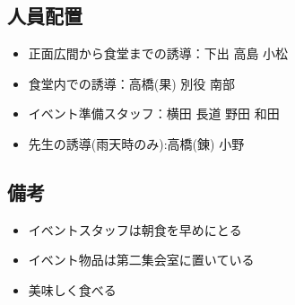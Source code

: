 \subsection{人員配置}
\begin{itemize}
\item 正面広間から食堂までの誘導：下出 高島 小松
\item 食堂内での誘導：高橋(果) 別役 南部
\item イベント準備スタッフ：横田 長道 野田 和田
  \item 先生の誘導(雨天時のみ):高橋(錬) 小野
\end{itemize}



\subsection{備考}
\begin{itemize}
\item イベントスタッフは朝食を早めにとる
\item イベント物品は第二集会室に置いている
\item 美味しく食べる


\end{itemize}

%

